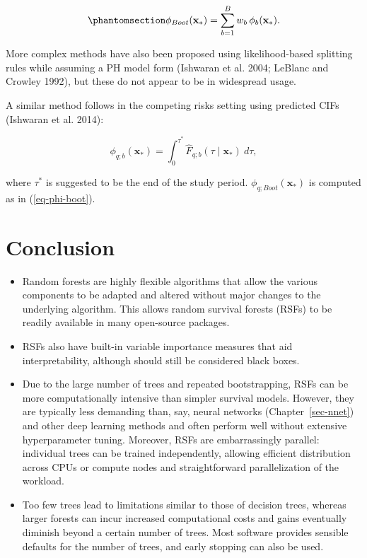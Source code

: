 \documentclass[
  letterpaper,
  krantz2]{style/krantz}
\providecommand{\tightlist}{%
  \setlength{\itemsep}{0pt}\setlength{\parskip}{0pt}}
\begin{document}
\begin{equation}\phantomsection\label{eq-phi-boot}{
\phi_{Boot}(\mathbf{x}_*) = \sum_{b=1}^B w_b\, \phi_b(\mathbf{x}_*).
}\end{equation}

More complex methods have also been proposed using likelihood-based
splitting rules while assuming a PH model form (Ishwaran et al. 2004;
LeBlanc and Crowley 1992), but these do not appear to be in widespread
usage.

A similar method follows in the competing risks setting using predicted
CIFs (Ishwaran et al. 2014):

\[
\phi_{q;b}(\mathbf{x}_*) = \int^{\tau^*}_0 \hat{F}_{q;b}(\tau \mid \mathbf{x}_*) \ d\tau,
\]

where \(\tau^*\) is suggested to be the end of the study period.
\(\phi_{q;Boot}(\mathbf{x}_*)\) is computed as in (\ref{eq-phi-boot}).

\section{Conclusion}\label{conclusion-9}

\begin{tcolorbox}[enhanced jigsaw, toprule=.15mm, bottomtitle=1mm, opacityback=0, breakable, leftrule=.75mm, title={Key takeaways}, toptitle=1mm, bottomrule=.15mm, colback=white, colframe=quarto-callout-warning-color-frame, titlerule=0mm, opacitybacktitle=0.6, coltitle=black, rightrule=.15mm, left=2mm, colbacktitle=quarto-callout-warning-color!10!white, arc=.35mm]

\begin{itemize}
\tightlist
\item
  Random forests are highly flexible algorithms that allow the various
  components to be adapted and altered without major changes to the
  underlying algorithm. This allows random survival forests (RSFs) to be
  readily available in many open-source packages.
\item
  RSFs also have built-in variable importance measures that aid
  interpretability, although should still be considered black boxes.
\item
  Due to the large number of trees and repeated bootstrapping, RSFs can
  be more computationally intensive than simpler survival models.
  However, they are typically less demanding than, say, neural networks
  (Chapter~\ref{sec-nnet}) and other deep learning methods and often
  perform well without extensive hyperparameter tuning. Moreover, RSFs
  are embarrassingly parallel: individual trees can be trained
  independently, allowing efficient distribution across CPUs or compute
  nodes and straightforward parallelization of the workload.
\item
  Too few trees lead to limitations similar to those of decision trees,
  whereas larger forests can incur increased computational costs and
  gains eventually diminish beyond a certain number of trees. Most
  software provides sensible defaults for the number of trees, and early
  stopping can also be used.
\end{itemize}

\end{tcolorbox}
\end{document}
